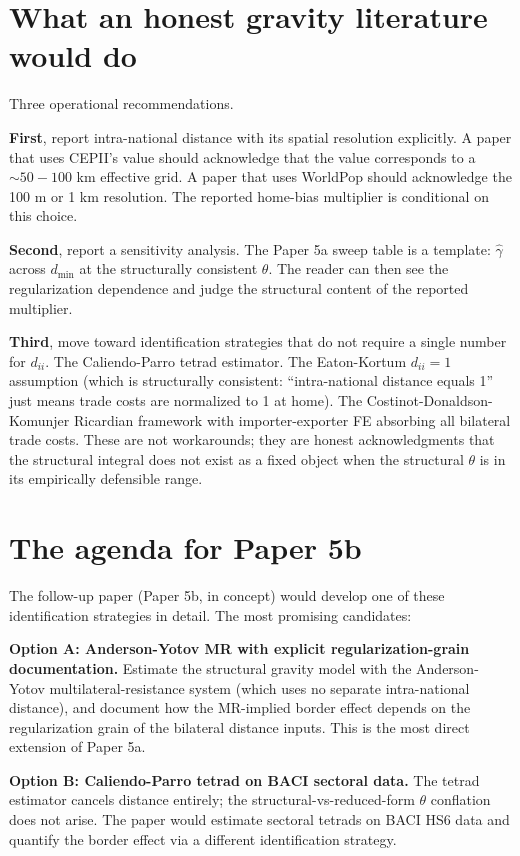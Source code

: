 \documentclass[11pt,letterpaper,oneside]{book}
\theoremstyle{definition}
\theoremstyle{remark}
\begin{document}
\section{What an honest gravity literature would do}

Three operational recommendations.

\textbf{First}, report intra-national distance with its spatial
resolution explicitly. A paper that uses CEPII's value should
acknowledge that the value corresponds to a $\sim 50-100$ km effective
grid. A paper that uses WorldPop should acknowledge the 100 m or 1 km
resolution. The reported home-bias multiplier is conditional on this
choice.

\textbf{Second}, report a sensitivity analysis. The Paper 5a sweep
table is a template: $\hat{\gamma}$ across $d_{\min}$ at the
structurally consistent $\theta$. The reader can then see the
regularization dependence and judge the structural content of the
reported multiplier.

\textbf{Third}, move toward identification strategies that do not
require a single number for $d_{ii}$. The Caliendo-Parro tetrad
estimator. The Eaton-Kortum $d_{ii} = 1$ assumption (which is
structurally consistent: ``intra-national distance equals 1'' just
means trade costs are normalized to 1 at home). The
Costinot-Donaldson-Komunjer Ricardian framework with importer-exporter
FE absorbing all bilateral trade costs. These are not workarounds;
they are honest acknowledgments that the structural integral does not
exist as a fixed object when the structural $\theta$ is in its
empirically defensible range.

\section{The agenda for Paper 5b}

The follow-up paper (Paper 5b, in concept) would develop one of these
identification strategies in detail. The most promising candidates:

\textbf{Option A: Anderson-Yotov MR with explicit regularization-grain
documentation.} Estimate the structural gravity model with the
Anderson-Yotov multilateral-resistance system (which uses no separate
intra-national distance), and document how the MR-implied border
effect depends on the regularization grain of the bilateral distance
inputs. This is the most direct extension of Paper 5a.

\textbf{Option B: Caliendo-Parro tetrad on BACI sectoral data.} The
tetrad estimator cancels distance entirely; the structural-vs-reduced-form
$\theta$ conflation does not arise. The paper would estimate sectoral
tetrads on BACI HS6 data and quantify the border effect via a different
identification strategy.
\end{document}
